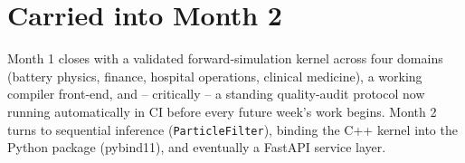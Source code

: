 \documentclass[11pt]{article}
\begin{document}
\section*{Carried into Month 2}
Month 1 closes with a validated forward-simulation kernel across four
domains (battery physics, finance, hospital operations, clinical
medicine), a working compiler front-end, and -- critically -- a
standing quality-audit protocol now running automatically in CI before
every future week's work begins. Month 2 turns to sequential inference
(\texttt{ParticleFilter}), binding the C++ kernel into the Python
package (pybind11), and eventually a FastAPI service layer.
\end{document}
